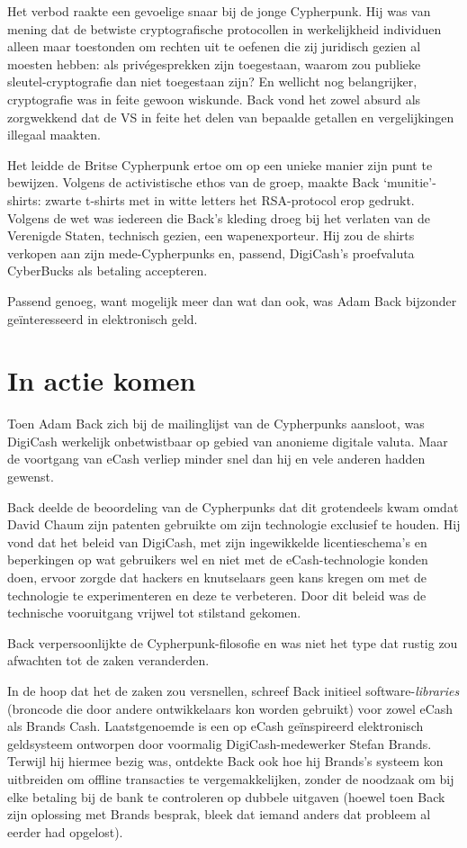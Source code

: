 \documentclass[
  a5paper,
  smalldemyvopaper,11pt,twoside,onecolumn,openright,extrafontsizes]{memoir}
\begin{document}
Het verbod raakte een gevoelige snaar bij de jonge Cypherpunk. Hij was
van mening dat de betwiste cryptografische protocollen in werkelijkheid
individuen alleen maar toestonden om rechten uit te oefenen die zij
juridisch gezien al moesten hebben: als privégesprekken zijn toegestaan,
waarom zou publieke sleutel-cryptografie dan niet toegestaan zijn? En
wellicht nog belangrijker, cryptografie was in feite gewoon wiskunde.
Back vond het zowel absurd als zorgwekkend dat de VS in feite het delen
van bepaalde getallen en vergelijkingen illegaal maakten.

Het leidde de Britse Cypherpunk ertoe om op een unieke manier zijn punt
te bewijzen. Volgens de activistische ethos van de groep, maakte Back
`munitie'-shirts: zwarte t-shirts met in witte letters het RSA-protocol
erop gedrukt. Volgens de wet was iedereen die Back's kleding droeg bij
het verlaten van de Verenigde Staten, technisch gezien, een
wapenexporteur. Hij zou de shirts verkopen aan zijn mede-Cypherpunks en,
passend, DigiCash's proefvaluta CyberBucks als betaling accepteren.

Passend genoeg, want mogelijk meer dan wat dan ook, was Adam Back
bijzonder geïnteresseerd in elektronisch geld.

\section{In actie komen}\label{in-actie-komen}

Toen Adam Back zich bij de mailinglijst van de Cypherpunks aansloot, was
DigiCash werkelijk onbetwistbaar op gebied van anonieme digitale valuta.
Maar de voortgang van eCash verliep minder snel dan hij en vele anderen
hadden gewenst.

Back deelde de beoordeling van de Cypherpunks dat dit grotendeels kwam
omdat David Chaum zijn patenten gebruikte om zijn technologie exclusief
te houden. Hij vond dat het beleid van DigiCash, met zijn ingewikkelde
licentieschema's en beperkingen op wat gebruikers wel en niet met de
eCash-technologie konden doen, ervoor zorgde dat hackers en knutselaars
geen kans kregen om met de technologie te experimenteren en deze te
verbeteren. Door dit beleid was de technische vooruitgang vrijwel tot
stilstand gekomen.

Back verpersoonlijkte de Cypherpunk-filosofie en was niet het type dat
rustig zou afwachten tot de zaken veranderden.

In de hoop dat het de zaken zou versnellen, schreef Back initieel
software-\emph{libraries} (broncode die door andere ontwikkelaars kon
worden gebruikt) voor zowel eCash als Brands Cash. Laatstgenoemde is een
op eCash geïnspireerd elektronisch geldsysteem ontworpen door voormalig
DigiCash-medewerker Stefan Brands. Terwijl hij hiermee bezig was,
ontdekte Back ook hoe hij Brands's systeem kon uitbreiden om offline
transacties te vergemakkelijken, zonder de noodzaak om bij elke betaling
bij de bank te controleren op dubbele uitgaven (hoewel toen Back zijn
oplossing met Brands besprak, bleek dat iemand anders dat probleem al
eerder had opgelost).
\end{document}
